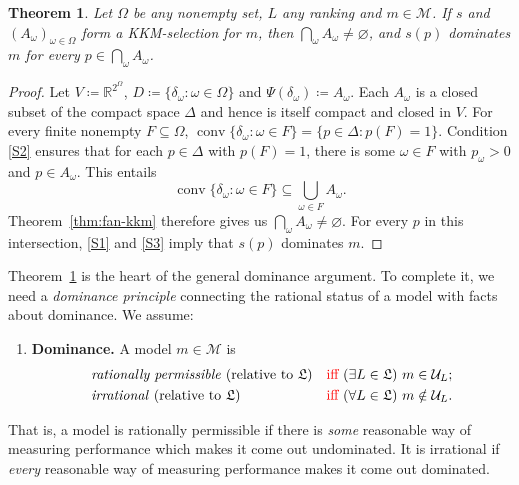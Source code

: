 \documentclass[11pt]{article}
\newcommand{\chg}[1]{{\color{red}#1}}
\newtheorem{theorem}{Theorem}[section]
\theoremstyle{definition}
\theoremstyle{remark}
\newcommand{\M}{\mathcal M}
\newcommand{\U}{\mathcal U}
\newcommand{\Lf}{\mathfrak L}
\begin{document}
\begin{theorem}\label{thm:selection}
Let $\Omega$ be any nonempty set, $L$ any ranking and $m\in\M$. If $s$ and $(A_\omega)_{\omega\in\Omega}$ form a KKM-selection for $m$, then $\bigcap_\omega A_\omega\ne\varnothing$, and $s(p)$ dominates $m$ for every $p\in\bigcap_\omega A_\omega$.
\end{theorem}
\begin{proof}
Let $V\coloneqq\mathbb R^{2^\Omega}$, $D\coloneqq\{\delta_\omega:\omega\in\Omega\}$ and $\Psi(\delta_\omega)\coloneqq A_\omega$. Each $A_\omega$ is a closed subset of the compact space $\Delta$ and hence is itself compact \chg{and closed in $V$}. For every finite nonempty $F\subseteq\Omega$, $\operatorname{conv}\{\delta_\omega:\omega\in F\}=\{p\in\Delta:p(F)=1\}$. Condition \ref{S2} ensures that for each $p\in\Delta$ with $p(F)=1$, there is some $\omega\in F$ with $p_\omega>0$ and $p\in A_\omega$. This entails
\[
\operatorname{conv}\{\delta_\omega:\omega\in F\}
\subseteq\bigcup_{\omega\in F}A_\omega.
\]
Theorem~\ref{thm:fan-kkm} therefore gives us $\bigcap_\omega A_\omega\ne\varnothing$. For every $p$ in this intersection, \ref{S1} and \ref{S3} imply that $s(p)$ dominates $m$.
\end{proof}



Theorem~\ref{thm:selection} is the heart of the general dominance argument. To complete it, we need a \textit{dominance principle} connecting the rational status of a model with facts about dominance. We assume:
\begin{enumerate}[label=\textbf{(D)},leftmargin=*]
\item\label{principle:dominance} \textbf{Dominance.} A model $m\in\M$ is
\begin{align*}
&\text{\emph{rationally permissible} (relative to $\Lf$)}&&\text{\chg{iff} }(\exists L\in\Lf)\ m\in\U_L;\\
&\text{\emph{irrational} (relative to $\Lf$)}&&\text{\chg{iff} }(\forall L\in\Lf)\ m\notin\U_L.
\end{align*}
\end{enumerate}
That is, a model is rationally permissible if there is \textit{some} reasonable way of measuring performance which makes it come out undominated. It is irrational if \textit{every} reasonable way of measuring performance makes it come out dominated.
\end{document}
